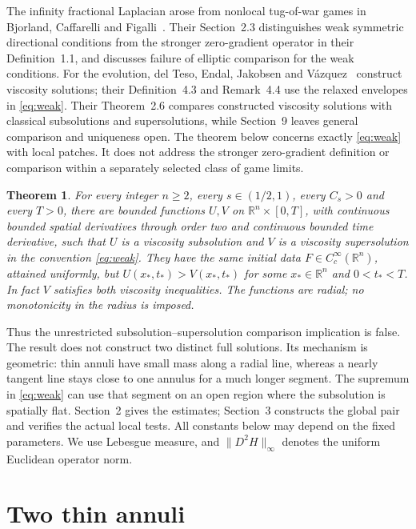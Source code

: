 \documentclass[11pt]{article}
\newtheorem{theorem}{Theorem}
\newcommand{\R}{\mathbb R}
\newcommand{\norm}[1]{\lVert#1\rVert_\infty}
\begin{document}
The infinity fractional Laplacian arose from nonlocal tug-of-war games in
Bjorland, Caffarelli and Figalli~\cite{BCF}. Their Section~2.3 distinguishes
weak symmetric directional conditions from the stronger zero-gradient
operator in their Definition~1.1, and discusses failure of elliptic comparison
for the weak conditions. For the evolution, del Teso, Endal, Jakobsen and
V\'azquez~\cite{DEJV} construct viscosity solutions; their Definition~4.3 and
Remark~4.4 use the relaxed envelopes in \eqref{eq:weak}. Their Theorem~2.6
compares constructed viscosity solutions with classical subsolutions and
supersolutions, while Section~9 leaves general comparison and uniqueness
open. The theorem below concerns exactly \eqref{eq:weak} with local patches.
It does not address the stronger zero-gradient definition or comparison
within a separately selected class of game limits.

\begin{theorem}\label{thm:main}
For every integer $n\ge2$, every $s\in(1/2,1)$, every $C_s>0$ and every
$T>0$, there are bounded functions $U,V$ on $\R^n\times[0,T]$, with
continuous bounded spatial derivatives through order two and continuous
bounded time derivative, such that $U$ is a viscosity subsolution and $V$ is
a viscosity supersolution in the convention \eqref{eq:weak}. They have the
same initial data $F\in C_c^\infty(\R^n)$, attained uniformly, but
$U(x_*,t_*)>V(x_*,t_*)$ for some $x_*\in\R^n$ and $0<t_*<T$.
In fact $V$ satisfies both viscosity inequalities. The functions are radial;
no monotonicity in the radius is imposed.
\end{theorem}

Thus the unrestricted subsolution--supersolution comparison implication is
false. The result does not construct two distinct full solutions. Its
mechanism is geometric: thin annuli have small mass along a radial line,
whereas a nearly tangent line stays close to one annulus for a much longer
segment. The supremum in \eqref{eq:weak} can use that segment on an open
region where the subsolution is spatially flat. Section~2 gives the estimates;
Section~3 constructs the global pair and verifies the actual local tests.
All constants below may depend on the fixed parameters. We use Lebesgue
measure, and $\norm{D^2H}$ denotes the uniform Euclidean operator norm.

\section{Two thin annuli}
\end{document}
